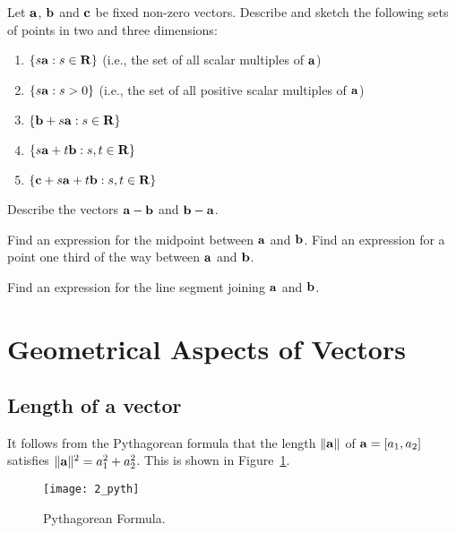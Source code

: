 \begin{problem}
\label{op1_1}
Let $\aa$, $\bb$ and $\cc$ be fixed non-zero vectors. Describe and
sketch the following sets of points in two and three dimensions:
\begin{enumerate}
\renewcommand{\labelenumi}{(\roman{enumi})}
\item $\{s\aa : s\in\RR\}$ (i.e., the set of all scalar multiples of
$\aa$)\par
\item $\{s\aa : s>0\}$ (i.e., the set of all positive scalar multiples
of $\aa$)\par
\item $\{\bb + s\aa : s\in\RR\}$\par
\item $\{s\aa + t\bb : s,t\in\RR\}$\par
\item $\{\cc + s\aa + t\bb : s,t\in\RR\}$\par
\end{enumerate}
\end{problem}

\begin{problem}
\label{op1_2}
Describe the vectors $\aa - \bb$ and $\bb - \aa$.
\end{problem}

\begin{problem}
\label{op1_3}
Find an expression for the midpoint between $\aa$ and $\bb$. Find an expression
for a point one third of the way between $\aa$ and $\bb$.
\end{problem}

\begin{problem}
\label{op1_4}
Find an expression for the line segment joining $\aa$ and $\bb$.
\end{problem}

\section{Geometrical Aspects of Vectors}

\subsection{Length of a vector}

It follows from the Pythagorean formula that the length $\|\aa\|$ of
$\aa=[a_1,a_2]$ satisfies $\|\aa\|^2=a_1^2+a_2^2$. This is shown in 
Figure~\ref{fig_pyth}.

\begin{figure}
\centerline{\texttt{[image: 2\_pyth]}}
\caption{Pythagorean Formula. \label{fig_pyth}}
\end{figure}

